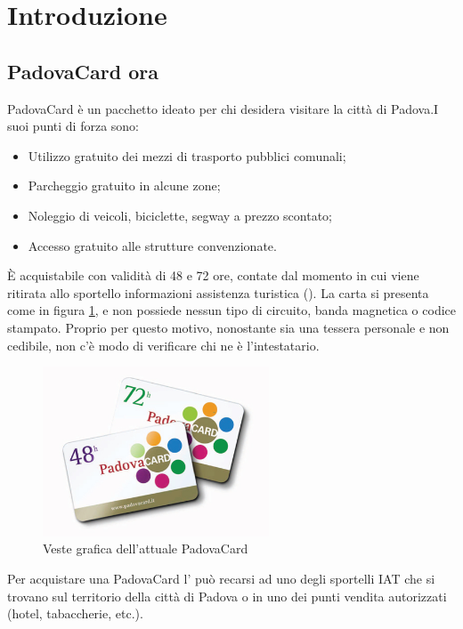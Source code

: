 \section{Introduzione}

\subsection{PadovaCard ora}
PadovaCard è un pacchetto ideato per chi desidera visitare la città di Padova.I suoi punti di forza sono:
\begin{itemize}
\item Utilizzo gratuito dei mezzi di trasporto pubblici comunali;
\item Parcheggio gratuito in alcune zone;
\item Noleggio di veicoli, biciclette, segway a prezzo scontato;
\item Accesso gratuito alle strutture convenzionate.
\end{itemize}
\`E acquistabile con validità di 48 e 72 ore, contate dal momento in cui viene ritirata allo sportello informazioni assistenza turistica ().
La carta si presenta come in figura \ref{immaginePadovaCard}, e non possiede nessun tipo di circuito, banda magnetica o codice stampato. 
Proprio per questo motivo, nonostante sia una tessera personale e non cedibile, non c'è modo di verificare chi ne è l'intestatario.\\

\begin{figure}[H]
\centering
\includegraphics[width=0.6\textwidth]{images/padovacard.jpg}
\caption{Veste grafica dell'attuale PadovaCard}\label{immaginePadovaCard}
\end{figure}

Per acquistare una PadovaCard l' può recarsi ad uno degli sportelli IAT che si trovano sul territorio della città di Padova o in uno dei punti vendita autorizzati (hotel, tabaccherie, etc.).\\

